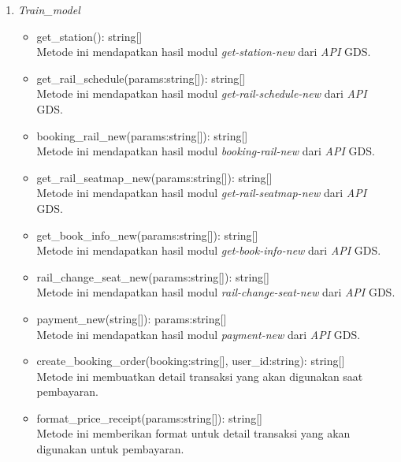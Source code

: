 \begin{enumerate}
    \item \textit{Train\_model}
    \begin{itemize}
        \item get\_station(): string[]\\
        Metode ini mendapatkan hasil modul \textit{get-station-new} dari \textit{API} GDS.
        \item get\_rail\_schedule(params:string[]): string[]\\
        Metode ini mendapatkan hasil modul \textit{get-rail-schedule-new} dari \textit{API} GDS.
        \item booking\_rail\_new(params:string[]): string[]\\
        Metode ini mendapatkan hasil modul \textit{booking-rail-new} dari \textit{API} GDS.
        \item get\_rail\_seatmap\_new(params:string[]): string[]\\
        Metode ini mendapatkan hasil modul \textit{get-rail-seatmap-new} dari \textit{API} GDS.
        \item get\_book\_info\_new(params:string[]): string[]\\
        Metode ini mendapatkan hasil modul \textit{get-book-info-new} dari \textit{API} GDS.
        \item rail\_change\_seat\_new(params:string[]): string[]\\
        Metode ini mendapatkan hasil modul \textit{rail-change-seat-new} dari \textit{API} GDS.
        \item payment\_new(string[]): params:string[]\\
        Metode ini mendapatkan hasil modul \textit{payment-new} dari \textit{API} GDS.
        \item create\_booking\_order(booking:string[], user\_id:string): string[]\\
        Metode ini membuatkan detail transaksi yang akan digunakan saat pembayaran.
        \item format\_price\_receipt(params:string[]): string[]\\
        Metode ini memberikan format untuk detail transaksi yang akan digunakan untuk pembayaran.
    \end{itemize}
    

\end{enumerate}
